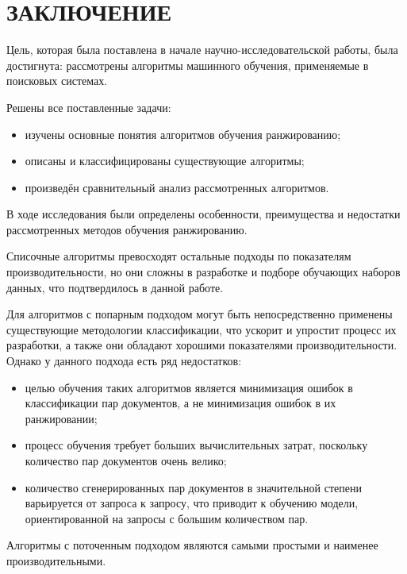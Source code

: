 \chapter*{ЗАКЛЮЧЕНИЕ}

Цель, которая была поставлена в начале научно-исследовательской работы, была достигнута: рассмотрены алгоритмы машинного обучения, применяемые в поисковых системах.

Решены все поставленные задачи:
\begin{itemize}[label=---]
	\item изучены основные понятия алгоритмов обучения ранжированию;
	\item описаны и классифицированы существующие алгоритмы;
	\item произведён сравнительный анализ рассмотренных алгоритмов.
\end{itemize}


В ходе исследования были определены особенности, преимущества и недостатки рассмотренных методов обучения ранжированию.

Списочные алгоритмы превосходят остальные подходы по показателям производительности, но они сложны в разработке и подборе обучающих наборов данных, что подтвердилось в данной работе.

Для алгоритмов с попарным подходом могут быть непосредственно применены существующие методологии классификации, что ускорит и упростит процесс их разработки, а также они обладают хорошими показателями производительности. Однако у данного подхода есть ряд недостатков:
\begin{itemize}[label=---]
	\item целью обучения таких алгоритмов является минимизация ошибок в классификации пар документов, а не минимизация ошибок в их ранжировании;
	\item процесс обучения требует больших вычислительных затрат, поскольку количество пар документов очень велико;
	\item количество сгенерированных пар документов в значительной степени варьируется от запроса к запросу, что приводит к обучению модели, ориентированной на запросы с большим количеством пар.
\end{itemize}

Алгоритмы с поточенным подходом являются самыми простыми и наименее производительными. 